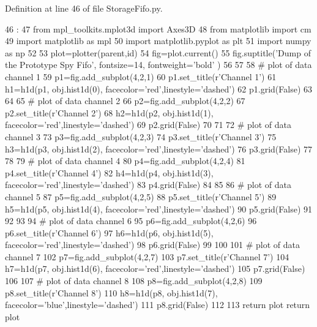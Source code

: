 Definition at line 46 of file StorageFifo.py.


\begin{DoxyCode}
46                               :
47     from mpl_toolkits.mplot3d import Axes3D
48     from matplotlib import cm
49     import matplotlib as mpl
50     import matplotlib.pyplot as plt
51     import numpy as np
52 
53     plot=plotter(parent,id)
54     fig=plot.current()
55     fig.suptitle('Dump of the Prototype Spy Fifo', fontsize=14, fontweight='bold'
      )
56     
57 
58     # plot of data channel 1
59     p1=fig.add_subplot(4,2,1)
60     p1.set_title(r'Channel 1')
61     h1=h1d(p1, obj.hist1d(0), facecolor='red',linestyle='dashed')
62     p1.grid(False)
63 
64 
65     # plot of data channel 2
66     p2=fig.add_subplot(4,2,2)
67     p2.set_title(r'Channel 2')
68     h2=h1d(p2, obj.hist1d(1), facecolor='red',linestyle='dashed')
69     p2.grid(False)
70 
71 
72     # plot of data channel 3
73     p3=fig.add_subplot(4,2,3)
74     p3.set_title(r'Channel 3')
75     h3=h1d(p3, obj.hist1d(2), facecolor='red',linestyle='dashed')
76     p3.grid(False)
77 
78 
79     # plot of data channel 4
80     p4=fig.add_subplot(4,2,4)
81     p4.set_title(r'Channel 4')
82     h4=h1d(p4, obj.hist1d(3), facecolor='red',linestyle='dashed')
83     p4.grid(False)
84 
85 
86     # plot of data channel 5
87     p5=fig.add_subplot(4,2,5)
88     p5.set_title(r'Channel 5')
89     h5=h1d(p5, obj.hist1d(4), facecolor='red',linestyle='dashed')
90     p5.grid(False)
91 
92 
93 
94     # plot of data channel 6
95     p6=fig.add_subplot(4,2,6)
96     p6.set_title(r'Channel 6')
97     h6=h1d(p6, obj.hist1d(5), facecolor='red',linestyle='dashed')
98     p6.grid(False)
99 
100 
101     # plot of data channel 7
102     p7=fig.add_subplot(4,2,7)
103     p7.set_title(r'Channel 7')
104     h7=h1d(p7, obj.hist1d(6), facecolor='red',linestyle='dashed')
105     p7.grid(False)
106 
107     # plot of data channel 8
108     p8=fig.add_subplot(4,2,8)
109     p8.set_title(r'Channel 8')
110     h8=h1d(p8, obj.hist1d(7), facecolor='blue',linestyle='dashed')
111     p8.grid(False)
112 
113     return plot
    return plot
\end{DoxyCode}
